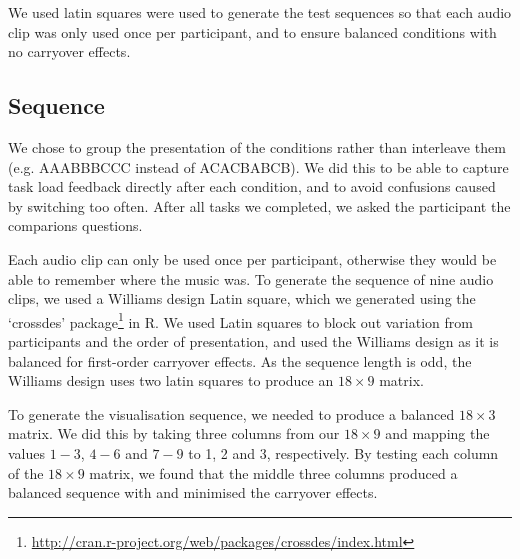We used latin squares were used to generate the test sequences so that each audio clip was only used once per
participant, and to ensure balanced conditions with no carryover effects.


\subsection{Sequence}\label{sec:studysequence}

We chose to group the presentation of the conditions rather than interleave them (e.g. AAABBBCCC instead of ACACBABCB).
We did this to be able to capture task load feedback directly after each condition, and to avoid confusions caused
by switching too often.
After all tasks we completed, we asked the participant the comparions questions.

Each audio clip can only be used once per participant, otherwise they would be able to remember where the music was.
To generate the sequence of nine audio clips, we used a Williams design Latin square, which we generated using the
`crossdes' package\footnote{\url{http://cran.r-project.org/web/packages/crossdes/index.html}} in R.  We used Latin
squares to block out variation from participants and the order of presentation, and used the Williams design as it is
balanced for first-order carryover effects. As the sequence length is odd, the Williams design uses two latin squares
to produce an $18\times9$ matrix.

To generate the visualisation sequence, we needed to produce a balanced $18\times3$ matrix. We did this by taking three
columns from our $18\times9$ and mapping the values $1-3$, $4-6$ and $7-9$ to 1, 2 and 3, respectively.  By testing
each column of the $18\times9$ matrix, we found that the middle three columns produced a balanced sequence with and
minimised the carryover effects.

